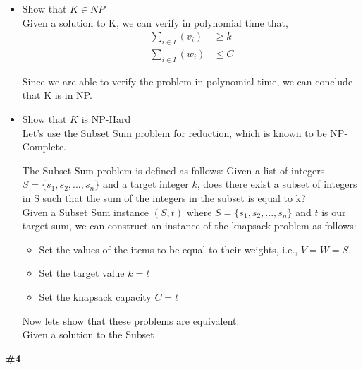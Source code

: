 \documentclass{article}
\newcommand{\problem}[1]{\textbf{\##1}}
\begin{document}
\begin{itemize}
    \item Show that $K \in NP$\\

    Given a solution to K, we can verify in polynomial time that,
    \begin{align}
        \sum_{i \in I}(v_i) &\geq k \\
        \sum_{i \in I}(w_i) &\leq C
    \end{align}

    Since we are able to verify the problem in polynomial time, we can conclude that K is in NP.\\

    \item Show that $K$ is NP-Hard\\
    
    Let's use the Subset Sum problem for reduction, which is known to be NP-Complete.

    The Subset Sum problem is defined as follows: Given a list of integers $S = \{s_1,s_2,...,s_n\}$ and a target integer $k$, does there exist a subset of integers in S such that the sum of the integers in the subset is equal to k?\\

    Given a Subset Sum instance $(S,t)$ where $S = \{s_1,s_2,...,s_n\}$ and $t$ is our target sum, we can construct an instance of the knapsack problem as follows:
    \begin{itemize}
        \item Set the values of the items to be equal to their weights, i.e., $V = W = S$.
        \item Set the target value $k = t$
        \item Set the knapsack capacity $C = t$
    \end{itemize}

    Now lets show that these problems are equivalent.\\

    Given a solution to the Subset 

\end{itemize}

\pagebreak

\problem{4}
\end{document}
